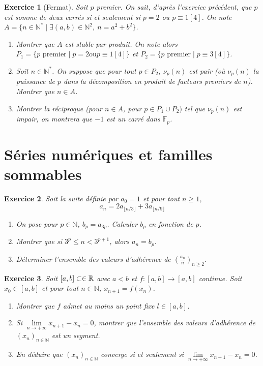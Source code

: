 \documentclass[12pt]{article}
\newtheorem{exercise}{Exercice}[section]
\theoremstyle{remark}
\theoremstyle{remark}
\newcommand{\N}{\mathbb{N}} \newcommand{\Z}{\mathbb{Z}}
\begin{document}
\begin{exercise}[Fermat]
	Soit $p$ premier. On sait, d'après l'exercice précédent, que $p$ est somme de
	deux carrés si et seulement si $p=2$ ou $p\equiv 1[4]$. On note
	$A=\{n\in\N^{*}\mid\exists(a,b)\in\N^{2},~n=a^{2}+b^{2}\}$.
	\begin{enumerate}
		\item
		Montrer que $A$ est stable par produit. On note alors $P_{1}=\{p
		\text{ premier}\mid p=2\text{ou}p\equiv 1[4]\}$ et
		$P_{2}=\{p\text{ premier}\mid p\equiv3[4]\}$.
		\item
		Soit $n\in\N^{*}$. On suppose que pour tout $p\in P_{2}$, $\nu_{p}(n)$ est
		pair (où $\nu_{p}(n)$ la puissance de $p$ dans la décomposition en produit
		de facteurs premiers de $n$). Montrer que $n\in A$.
		\item
		Montrer la réciproque (pour $n\in A$, pour $p\in P_{1}\cup P_{2})$ tel que
		$\nu_{p}(n)$ est impair, on montrera que $-1$ est un carré dans
		$\mathbb{F}_{p}$.
	\end{enumerate}
\end{exercise}

\cleardoublepage
\section{Séries numériques et familles sommables}

\begin{exercise}
	Soit la suite définie par $a_{0}=1$ et pour tout $n\geqslant1$,
	$$a_{n}=2a_{\lfloor n/3\rfloor}+3a_{\lfloor n/9\rfloor}$$
	\begin{enumerate}
		\item
		On pose pour $p\in\N$, $b_{p}=a_{3p}$. Calculer $b_{p}$ en fonction de
		$p$.
		\item
		Montrer que si $3^{p}\leqslant n<3^{p+1}$, alors $a_{n}=b_{p}$.
		\item
		Déterminer l'ensemble des valeurs d'adhérence de
		$(\frac{a_{n}}{n})_{n\geqslant 2}$.
	\end{enumerate}
\end{exercise}

\begin{exercise}
	Soit $[a,b]\subset\in\mathbb{R}$ avec $a<b$ et $f:[a,b]\to[a,b]$ continue. Soit
	$x_{0}\in[a,b]$ et pour tout $n\in\N$, $x_{n+1}=f(x_{n})$.
	\begin{enumerate}
		\item
		Montrer que $f$ admet au moins un point fixe $l\in[a,b]$.
		\item
		Si $\lim\limits_{n\to+\infty}x_{n+1}-x_{n}=0$, montrer que l'ensemble des
		valeurs d'adhérence de $(x_{n})_{n\in\N}$ est un segment.
		\item
		En déduire que $(x_{n})_{n\in\N}$ converge si et seulement si
		$\lim\limits_{n\to+\infty}x_{n+1}-x_{n}=0$.
	\end{enumerate}
\end{exercise}
\end{document}
